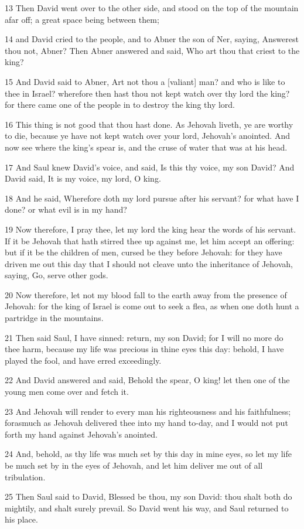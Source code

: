 \par 13 Then David went over to the other side, and stood on the top of the mountain afar off; a great space being between them;
\par 14 and David cried to the people, and to Abner the son of Ner, saying, Answerest thou not, Abner? Then Abner answered and said, Who art thou that criest to the king?
\par 15 And David said to Abner, Art not thou a [valiant] man? and who is like to thee in Israel? wherefore then hast thou not kept watch over thy lord the king? for there came one of the people in to destroy the king thy lord.
\par 16 This thing is not good that thou hast done. As Jehovah liveth, ye are worthy to die, because ye have not kept watch over your lord, Jehovah's anointed. And now see where the king's spear is, and the cruse of water that was at his head.
\par 17 And Saul knew David's voice, and said, Is this thy voice, my son David? And David said, It is my voice, my lord, O king.
\par 18 And he said, Wherefore doth my lord pursue after his servant? for what have I done? or what evil is in my hand?
\par 19 Now therefore, I pray thee, let my lord the king hear the words of his servant. If it be Jehovah that hath stirred thee up against me, let him accept an offering: but if it be the children of men, cursed be they before Jehovah: for they have driven me out this day that I should not cleave unto the inheritance of Jehovah, saying, Go, serve other gods.
\par 20 Now therefore, let not my blood fall to the earth away from the presence of Jehovah: for the king of Israel is come out to seek a flea, as when one doth hunt a partridge in the mountains.
\par 21 Then said Saul, I have sinned: return, my son David; for I will no more do thee harm, because my life was precious in thine eyes this day: behold, I have played the fool, and have erred exceedingly.
\par 22 And David answered and said, Behold the spear, O king! let then one of the young men come over and fetch it.
\par 23 And Jehovah will render to every man his righteousness and his faithfulness; forasmuch as Jehovah delivered thee into my hand to-day, and I would not put forth my hand against Jehovah's anointed.
\par 24 And, behold, as thy life was much set by this day in mine eyes, so let my life be much set by in the eyes of Jehovah, and let him deliver me out of all tribulation.
\par 25 Then Saul said to David, Blessed be thou, my son David: thou shalt both do mightily, and shalt surely prevail. So David went his way, and Saul returned to his place.

